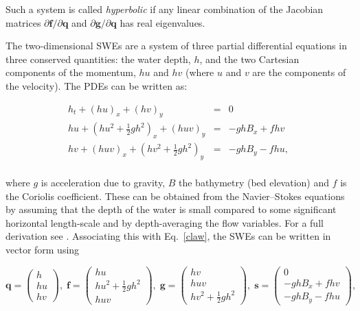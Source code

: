 \documentclass[a4paper,onecolumn,11pt]{article}
\renewcommand{\vec}[1]{\ensuremath{\mathbf{#1}}}
\begin{document}
Such a system is called \emph{hyperbolic} if any linear combination of the Jacobian matrices $\partial\vec{f}/\partial\vec{q}$ and $\partial\vec{g}/\partial\vec{q}$ has real eigenvalues.

The two-dimensional SWEs are a system of three partial differential equations in three conserved quantities: the water depth, $h$, and the two Cartesian components of the momentum, $hu$ and $hv$ (where $u$ and $v$ are the components of the velocity). The PDEs can be written as:

\begin{eqnarray*}
                        h_t + (hu)_x + (hv)_y & = & 0 \\
    hu + (hu^2 + \frac{1}{2}gh^2)_x + (huv)_y & = & - ghB_x + fhv \\
    hv + (huv)_x + (hv^2 + \frac{1}{2}gh^2)_y & = & - ghB_y - fhu, \\
\end{eqnarray*}

where $g$ is acceleration due to gravity, $B$ the bathymetry (bed elevation) and $f$ is the Coriolis coefficient. These can be obtained from the Navier--Stokes equations by assuming that the depth of the water is small compared to some significant horizontal length-scale and by depth-averaging the flow variables. For a full derivation see \citet{dellar2005shallow}. Associating this with Eq.~\ref{claw}, the SWEs can be written in vector form using

$$
    \vec{q} = \left( \begin{array}{c}
        h \\
        hu \\
        hv
    \end{array} \right),\;
    \vec{f} = \left( \begin{array}{c}
        hu \\
        hu^2 + \frac{1}{2}gh^2 \\
        huv
    \end{array} \right),\;
    \vec{g} = \left( \begin{array}{c}
        hv \\
        huv \\
        hv^2 + \frac{1}{2}gh^2
    \end{array} \right),\;
    \vec{s} = \left( \begin{array}{c}
        0 \\
        - ghB_x + fhv \\
        - ghB_y - fhu
    \end{array} \right),
$$
\end{document}
